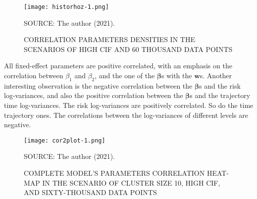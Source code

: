 \begin{figure}[H]
 \setlength{\abovecaptionskip}{.0001pt}
 \caption{CORRELATION PARAMETERS DENSITIES IN THE SCENARIOS OF HIGH CIF
          AND 60 THOUSAND DATA POINTS}
 \vspace{0.2cm}\centering
 \texttt{[image: historhoz-1.png]}\\
 \begin{footnotesize}
  SOURCE: The author (2021).
 \end{footnotesize}
 \label{fig:historhoz}
\end{figure}

All fixed-effect parameters are positive correlated, with an emphasis on
the correlation between \(\beta_{1}\) and \(\beta_{2}\), and the one of
the \(\bm{\beta}\)s with the \(\bm{w}\)s. Another interesting
observation is the negative correlation between the \(\bm{\beta}\)s and
the risk log-variances, and also the positive correlation between the
\(\bm{\beta}\)s and the trajectory time log-variances. The risk
log-variances are positively correlated. So do the time trajectory
ones. The correlations between the log-variances of different levels are
negative.

\begin{figure}[H]
 \setlength{\abovecaptionskip}{.0001pt}
 \caption{COMPLETE MODEL'S PARAMETERS CORRELATION HEAT-MAP IN THE
          SCENARIO OF CLUSTER SIZE 10, HIGH CIF, AND SIXTY-THOUSAND DATA
          POINTS}
 \centering
 \texttt{[image: cor2plot-1.png]}\\
 \vspace{-0.2cm}
 \begin{footnotesize}
  SOURCE: The author (2021).
 \end{footnotesize}
 \label{fig:cor2plot}
\end{figure}

